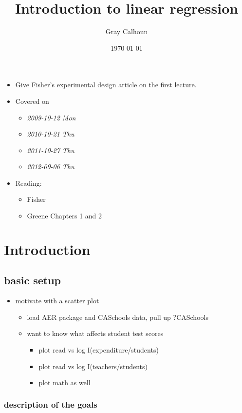 \documentclass[11pt]{article}
\title{Introduction to linear regression}
\author{Gray Calhoun}
\date{\today}
\begin{document}
\maketitle

\setcounter{tocdepth}{2}
\tableofcontents
\vspace*{1cm}
\begin{itemize}
\item Give Fisher's experimental design article on the first lecture.
\item Covered on
\begin{itemize}
\item \textit{2009-10-12 Mon}
\item \textit{2010-10-21 Thu}
\item \textit{2011-10-27 Thu}
\item \textit{2012-09-06 Thu}
\end{itemize}
\item Reading:
\begin{itemize}
\item Fisher
\item Greene Chapters 1 and 2
\end{itemize}
\end{itemize}
\section{Introduction}
\label{sec-1}
\subsection{basic setup}
\label{sec-1-1}

\begin{itemize}
\item motivate with a scatter plot
\begin{itemize}
\item load AER package and CASchools data, pull up ?CASchools
\item want to know what affects student test scores
\begin{itemize}
\item plot read vs log I(expenditure/students)
\item plot read vs log I(teachers/students)
\item plot math as well
\end{itemize}
\end{itemize}
\end{itemize}
\subsubsection{description of the goals}
\label{sec-1-1-1}
\end{document}

